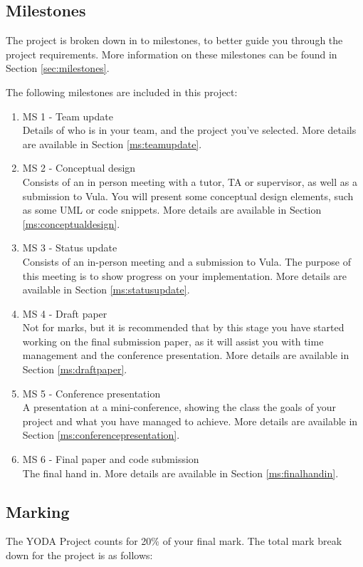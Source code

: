 \subsection{Milestones}
\label{sec:overview_milestones}
The project is broken down in to milestones, to better guide you through the project requirements. More information on these milestones can be found in Section \ref{sec:milestones}.

The following milestones are included in this project:
\begin{enumerate}
    \item MS 1 - Team update\\
    Details of who is in your team, and the project you've selected. More details are available in Section \ref{ms:teamupdate}.
    \item MS 2 - Conceptual design\\
    Consists of an in person meeting with a tutor, TA or supervisor, as well as a submission to Vula. You will present some conceptual design elements, such as some UML or code snippets. More details are available in Section \ref{ms:conceptualdesign}.
    \item MS 3 - Status update\\
    Consists of an in-person meeting and a submission to Vula. The purpose of this meeting is to show progress on your implementation. More details are available in Section \ref{ms:statusupdate}.
    \item MS 4 - Draft paper\\
    Not for marks, but it is recommended that by this stage you have started working on the final submission paper, as it will assist you with time management and the conference presentation. More details are available in Section \ref{ms:draftpaper}.
    \item MS 5 - Conference presentation\\
    A presentation at a mini-conference, showing the class the goals of your project and what you have managed to achieve. More details are available in Section \ref{ms:conferencepresentation}.
    \item MS 6 - Final paper and code submission\\
    The final hand in. More details are available in Section \ref{ms:finalhandin}.
\end{enumerate}

\subsection{Marking}
The YODA Project counts for 20\% of your final mark. The total mark break down for the project is as follows:

